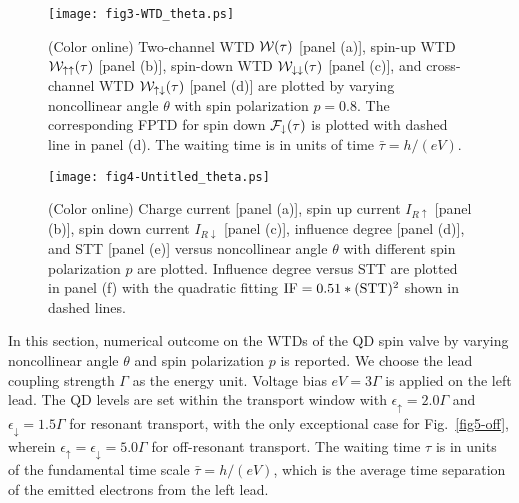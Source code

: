 \documentclass[aps,prb,twocolumn,footinbib,showpacs,superscriptaddress,preprintnumbers,amsmath,amssymb]{revtex4-1}
\begin{document}
\begin{figure}
\centering
  \texttt{[image: fig3-WTD\_theta.ps]} \\
  \caption{(Color online) Two-channel WTD ${\cal W}(\tau)$ [panel (a)], spin-up WTD ${\cal W}_{\uparrow\uparrow}(\tau)$ [panel (b)], spin-down WTD ${\cal W}_{\downarrow\downarrow}(\tau)$ [panel (c)], and cross-channel WTD ${\cal W}_{\uparrow\downarrow}(\tau)$ [panel (d)] are plotted by varying noncollinear angle $\theta$ with spin polarization $p=0.8$. 
The corresponding FPTD for spin down ${\cal F}_{\downarrow}(\tau)$ is plotted with dashed line in panel (d). The waiting time is in units of time $\bar{\tau}=h/(eV)$. }
  \label{fig3}
\end{figure}

\begin{figure}
\centering
  \texttt{[image: fig4-Untitled\_theta.ps]} \\
  \caption{(Color online) Charge current [panel (a)], spin up current $I_{R\uparrow}$ [panel (b)], spin down current $I_{R\downarrow}$ [panel (c)], influence degree [panel (d)], and STT [panel (e)] versus noncollinear angle $\theta$ with different spin polarization $p$ are plotted. Influence degree versus STT are plotted in panel (f) with the quadratic fitting ${\rm IF}=0.51*({\rm STT})^2$ shown in dashed lines. }
  \label{fig4}
\end{figure}

	In this section, numerical outcome on the WTDs of the QD spin valve by varying noncollinear angle $\theta$ and spin polarization $p$ is reported. We choose the lead coupling strength $\Gamma$ as the energy unit. Voltage bias $eV=3\Gamma$ is applied on the left lead. The QD levels are set within the transport window with $\epsilon_\uparrow=2.0\Gamma$ and $\epsilon_\downarrow =1.5\Gamma$ for resonant transport, with the only exceptional case for Fig.~\ref{fig5-off}, wherein $\epsilon_\uparrow=\epsilon_\downarrow=5.0\Gamma$ for off-resonant transport. The waiting time $\tau$ is in units of the fundamental time scale $\bar{\tau}=h/(eV)$, which is the average time separation of the emitted electrons from the left lead. 
\end{document}
